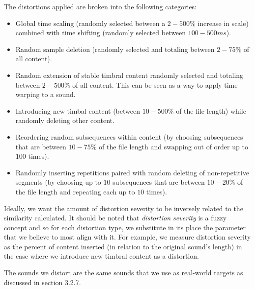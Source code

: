 \documentclass[a4paper,12pt]{report} 	%
\numberwithin{figure}{chapter}
\numberwithin{table}{chapter}
\numberwithin{equation}{chapter}
\begin{document}
\begin{flushleft}
The distortions applied are broken into the following categories:
\begin{itemize}
\item Global time scaling (randomly selected between a $2-500\%$ increase in scale) combined with time shifting (randomly selected between $100-500ms$).
\item Random sample deletion (randomly selected and totaling between $2-75\%$ of all content).
\item Random extension of stable timbral content randomly selected and totaling between $2-500\%$ of all content. This can be seen as a way to apply time warping to a sound.
\item Introducing new timbal content (between $10-500\%$ of the file length) while randomly deleting other content.
\item Reordering random subsequences within content (by choosing subsequences that are between $10-75\%$ of the file length and swapping out of order up to $100$ times).
\item Randomly inserting repetitions paired with random deleting of non-repetitive segments (by choosing up to $10$ subsequences that are between $10-20\%$ of the file length and repeating each up to $10$ times).
\end{itemize}

Ideally, we want the amount of distortion severity to be inversely related to the similarity calculated. It should be noted that \emph{distortion severity} is a fuzzy concept and so for each distortion type, we substitute in its place the parameter that we believe to most align with it. For example, we measure distortion severity as the percent of content inserted (in relation to the original sound's length) in the case where we introduce new timbral content as a distortion.

The sounds we distort are the same sounds that we use as real-world targets as discussed in section 3.2.7.


\end{flushleft}
\end{document}
